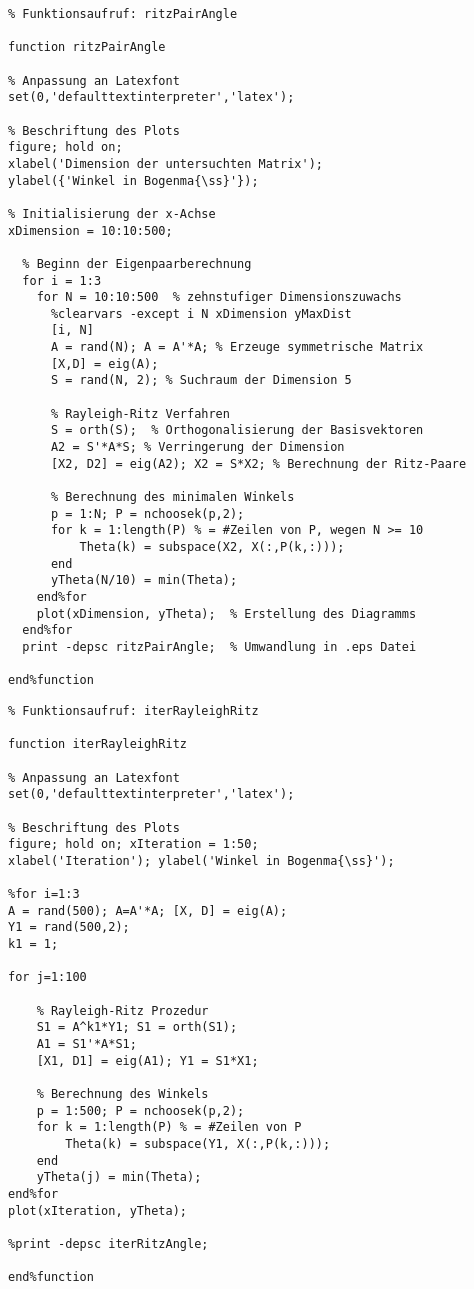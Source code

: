\newpage
\begin{lstlisting}[caption=Berechnung des Winkels zwischen Ritz- und Eigenvektoren, captionpos=b, label=alg:appAlgorithm:ritzVecAngle]
% Eingabe: -; Ausgabe: -
% Funktionsaufruf: ritzPairAngle

function ritzPairAngle

% Anpassung an Latexfont
set(0,'defaulttextinterpreter','latex');

% Beschriftung des Plots
figure; hold on;
xlabel('Dimension der untersuchten Matrix');
ylabel({'Winkel in Bogenma{\ss}'});

% Initialisierung der x-Achse
xDimension = 10:10:500;

  % Beginn der Eigenpaarberechnung
  for i = 1:3
    for N = 10:10:500  % zehnstufiger Dimensionszuwachs
      %clearvars -except i N xDimension yMaxDist
      [i, N]
      A = rand(N); A = A'*A; % Erzeuge symmetrische Matrix
      [X,D] = eig(A);
      S = rand(N, 2); % Suchraum der Dimension 5

      % Rayleigh-Ritz Verfahren
      S = orth(S);  % Orthogonalisierung der Basisvektoren
      A2 = S'*A*S; % Verringerung der Dimension
      [X2, D2] = eig(A2); X2 = S*X2; % Berechnung der Ritz-Paare

      % Berechnung des minimalen Winkels
      p = 1:N; P = nchoosek(p,2);
      for k = 1:length(P) % = #Zeilen von P, wegen N >= 10
          Theta(k) = subspace(X2, X(:,P(k,:)));
      end
      yTheta(N/10) = min(Theta);
    end%for
    plot(xDimension, yTheta);  % Erstellung des Diagramms
  end%for
  print -depsc ritzPairAngle;  % Umwandlung in .eps Datei

end%function
\end{lstlisting}

\newpage

\begin{lstlisting}[caption=Berechnung des Winkels zwischen Ritz- und Eigenvektoren bei iterativem Rayleigh-Ritz Verfahren, captionpos=b, label=alg:appAlgorithm:iterRitzVecAngle]
% Eingabe: -; Ausgabe: -
% Funktionsaufruf: iterRayleighRitz

function iterRayleighRitz

% Anpassung an Latexfont
set(0,'defaulttextinterpreter','latex');

% Beschriftung des Plots
figure; hold on; xIteration = 1:50;
xlabel('Iteration'); ylabel('Winkel in Bogenma{\ss}');

%for i=1:3
A = rand(500); A=A'*A; [X, D] = eig(A);
Y1 = rand(500,2);
k1 = 1;

for j=1:100

    % Rayleigh-Ritz Prozedur
    S1 = A^k1*Y1; S1 = orth(S1);
    A1 = S1'*A*S1;
    [X1, D1] = eig(A1); Y1 = S1*X1;

    % Berechnung des Winkels
    p = 1:500; P = nchoosek(p,2);
    for k = 1:length(P) % = #Zeilen von P
        Theta(k) = subspace(Y1, X(:,P(k,:)));
    end
    yTheta(j) = min(Theta);
end%for
plot(xIteration, yTheta);

%print -depsc iterRitzAngle;

end%function
\end{lstlisting}

